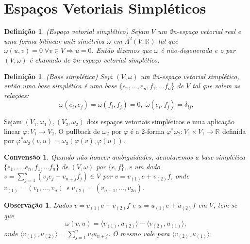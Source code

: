 \documentclass[12pt]{book}
\newtheorem{convensao}[teorema]{Convensão}
\newtheorem{definicao}[teorema]{Definição}
\newtheorem{observacao}[teorema]{Observação}
\newcommand{\formaSimpletica}[2]{\omega(#1, #2)}
\newcommand{\produtointerno}[2]{\langle #1, #2 \rangle}
\newcommand{\real}[1]{\mathbb{R}^{#1}}
\newcommand{\reta}{\real{}}
\begin{document}
	\section{Espaços Vetoriais Simpléticos}
	\begin{definicao}
		(Espaço vetorial simplético) Sejam $V$ um 2n-espaço vetorial real e uma forma bilinear anti-simétrica $\omega$ em $\Lambda^{2}(V, \real{})$ tal que $\omega(u,v) = 0 \; \forall v \in V \Rightarrow u=0$. Então dizemos que $\omega$ é não-degenerada e o par $(V, \omega)$ é chamado de 2n-espaço vetorial simplético.
	\end{definicao}
	
	\begin{definicao}
		(Base simplética) Seja $(V, \omega)$ um 2n-espaço vetorial simplético, então uma base simplética é uma base $\{ e_{1},\dots, e_{n},f_{1},\dots f_{n}\}$ de $V$ tal que valem as relações:
		$$
		\omega(e_{i}, e_{j}) = \omega(f_{i}, f_{j}) = 0, \; \omega(e_{i}, f_{j}) = \delta_{ij}.
		$$
	\end{definicao}
	
	Sejam $(V_{1}, \omega_{1}), (V_{2}, \omega_{2})$ dois espaços vetoriais simpléticos e uma aplicação linear $\varphi: V_{1}\to V_{2}$. O pullback de $\omega_{2}$ por $\varphi$ é a 2-forma $\varphi^{*}\omega_{2}:V_{1} \times V_{1} \to \reta$ definida por $\varphi^{*}\omega_{2}(v,u) = \omega_{2}(\varphi(v), \varphi(u))$.
	
	\begin{convensao}\label{convensao_base_simpletica}
		Quando não houver ambiguidades, denotaremos a base simplética  $\{ e_{1},\dots, e_{n},f_{1},\dots f_{n}\}$  de $(V, \omega)$ por  $\{ e ,f\}$, e um dado $v =\sum_{j=1}^{n}( v_{j}e_{j} +v_{n+j}f_{j}) \in V$ por $v=v_{(1)}e+v_{(2)}f$, onde $v_{(1)}=(v_{1}, \dots, v_{n})$ e $v_{(2)}=(v_{n+1}, \dots, v_{2n})$.
	\end{convensao}
	
	\begin{observacao}\label{observacao_convensao_base_simpletica}
		Dados $v=v_{(1)}e+v_{(2)}f$ e $u=u_{(1)}e+u_{(2)}f$ em $V$, tem-se que 
		$$
		\formaSimpletica{v}{u} = \produtointerno{v_{(1)}}{u_{(2)}}-\produtointerno{v_{(2)}}{u_{(1)}}, 
		$$
		onde $\produtointerno{v_{(1)}}{u_{(2)}}=\sum_{j=1}^{n}v_{j}u_{n+j}$. O mesmo vale para $\produtointerno{v_{(2)}}{u_{(1)}}$.
	\end{observacao}
	
\end{document}
